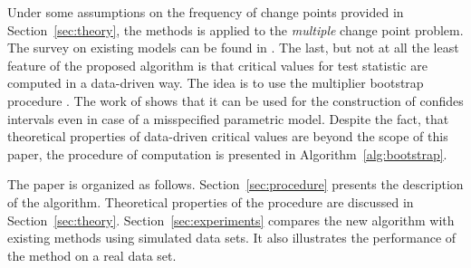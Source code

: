 Under some assumptions on the frequency of change points provided in Section~\ref{sec:theory}, the methods is applied to the \textit{multiple} change point problem. The survey on existing models can be found in \citet{chib98estimation}.
The last, but not at all the least feature of the proposed algorithm is that critical values for test statistic are computed in a data-driven way. The idea is to use the multiplier bootstrap procedure \citet{ChernozukovBoot}. The work of \citet{SpokoinyBoot}shows that it can be used for the construction of confides intervals even in case of a misspecified parametric model. Despite the fact, that theoretical properties of data-driven critical values are beyond the scope of this paper, the procedure of computation is presented in Algorithm~\ref{alg:bootstrap}.

The paper is organized as follows. Section~\ref{sec:procedure} presents the description of the algorithm. Theoretical properties of the procedure are discussed in Section~\ref{sec:theory}. Section~\ref{sec:experiments} compares the new algorithm with existing methods using simulated data sets. It also illustrates the performance of the method on a real data set. 



